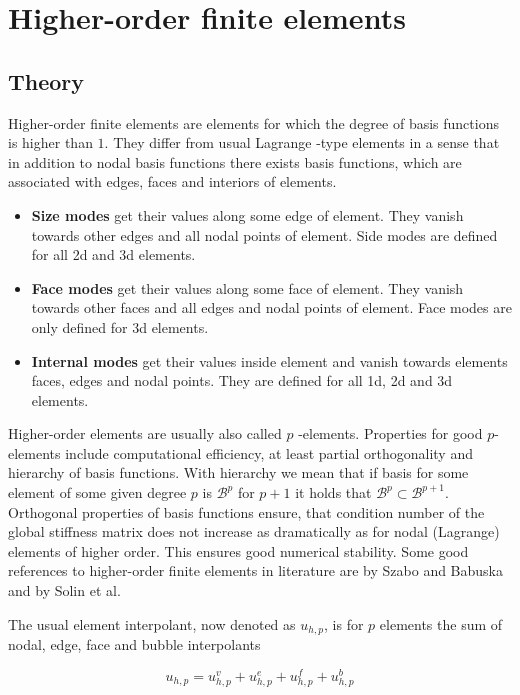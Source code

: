\chapter{Higher-order finite elements}

\section{Theory}

Higher-order finite elements are elements for which the degree of basis functions is higher than $1$. They differ from usual Lagrange -type elements in a sense that in addition to nodal basis functions there exists basis functions, which are associated with edges, faces and interiors of elements.

\begin{itemize}
\item \textbf{Size modes} get their values along some edge of element. They vanish towards other edges and all nodal points of element. Side modes are defined for all 2d and 3d elements. 
\item \textbf{Face modes} get their values along some face of element. They vanish towards other faces and all edges and nodal points of element. Face modes are only defined for 3d elements. 
\item \textbf{Internal modes} get their values inside element and vanish towards elements faces, edges and nodal points. They are defined for all 1d, 2d and 3d elements. 
\end{itemize}

Higher-order elements are usually also called $p$ -elements. Properties for good $p$-elements include computational efficiency, at least partial orthogonality and hierarchy of basis functions. With hierarchy we mean that if basis for some element of some given degree $p$ is $\mathcal{B}^p$ for $p+1$ it holds that $\mathcal{B}^p \subset \mathcal{B}^{p+1}$. Orthogonal properties of basis functions ensure, that condition number of the global stiffness matrix does not increase as dramatically as for nodal (Lagrange) elements of higher order. This ensures good numerical stability. Some good references to higher-order finite elements in literature are \cite{SzaboBabu} by Szabo and Babuska and \cite{Solin} by Solin et al. 

The usual element interpolant, now denoted as $u_{h,p}$, is for $p$ elements the sum of nodal, edge, face and bubble interpolants

\begin{equation}
 u_{h,p}=u_{h,p}^v+u_{h,p}^e+u_{h,p}^f+u_{h,p}^b
\end{equation}

